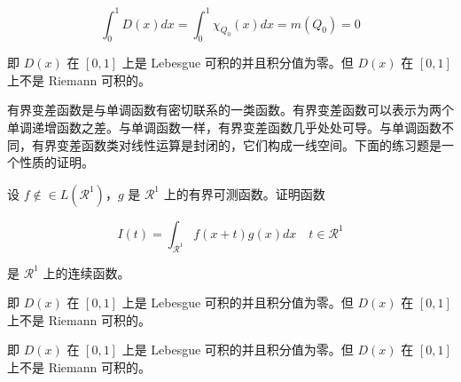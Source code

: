 \documentclass[cn,11pt,fancy,hide]{elegantbook}
\begin{document}
\begin{equation}
   \label{inter2}
   \int_0^1 D(x)dx = \int_0^1 \chi_{Q_0} (x) dx = m(Q_0) = 0
\end{equation}

即 \(D(x)\) 在 \([0,1]\) 上是 Lebesgue 可积的并且积分值为零。但 \(D(x)\) 在 \([0,1]\) 上不是 Riemann 可积的。

有界变差函数是与单调函数有密切联系的一类函数。有界变差函数可以表示为两个单调递增函数之差。与单调函数一样，有界变差函数几乎处处可导。与单调函数不同，有界变差函数类对线性运算是封闭的，它们构成一线空间。下面的练习题是一个性质的证明。

\begin{shaded}

设 \(f \notin\in L(\mathcal{R}^1)\)，\(g\) 是 \(\mathcal{R}^1\) 上的有界可测函数。证明函数

\begin{equation}
   \label{ex:1}
   I(t) = \int_{\mathcal{R}^1} f(x+t)g(x)dx \quad t \in \mathcal{R}^1
\end{equation}

是 \(\mathcal{R}^1\) 上的连续函数。

\end{shaded}

\begin{shaded}

即 \(D(x)\) 在 \([0,1]\) 上是 Lebesgue 可积的并且积分值为零。但 \(D(x)\) 在 \([0,1]\) 上不是 Riemann 可积的。

\end{shaded}

\begin{shaded}

即 \(D(x)\) 在 \([0,1]\) 上是 Lebesgue 可积的并且积分值为零。但 \(D(x)\) 在 \([0,1]\) 上不是 Riemann 可积的。

\end{shaded}
\end{document}
